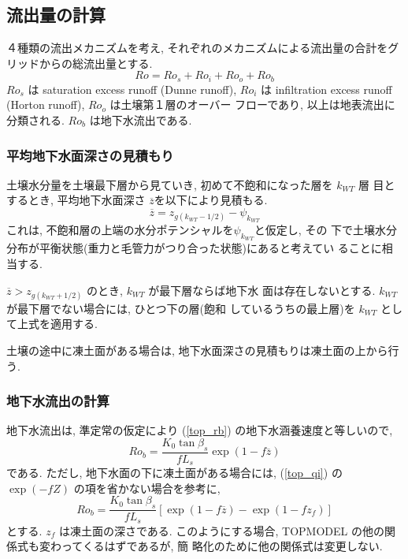 \subsection{流出量の計算}

４種類の流出メカニズムを考え, それぞれのメカニズムによる流出量の合計をグ
リッドからの総流出量とする. 
\begin{equation}
 Ro = Ro_s + Ro_i + Ro_o + Ro_b
\end{equation}
$Ro_s$ は saturation excess runoff (Dunne runoff), $Ro_i$ は
infiltration excess runoff (Horton runoff), $Ro_o$ は土壌第１層のオーバー
フローであり, 以上は地表流出に分類される. $Ro_b$ は地下水流出である. 

\subsubsection{平均地下水面深さの見積もり}

土壌水分量を土壌最下層から見ていき, 初めて不飽和になった層を $k_{WT}$ 層
目とするとき, 平均地下水面深さ $\overline{z}$を以下により見積もる. 
\begin{equation}
 \overline{z} = z_{g(k_{WT}-1/2)} - \psi_{k_{WT}}
\label{roff_table}
\end{equation}
これは, 不飽和層の上端の水分ポテンシャルを$\psi_{k_{WT}}$と仮定し, その
下で土壌水分分布が平衡状態(重力と毛管力がつり合った状態)にあると考えてい
ることに相当する. 

$\overline{z} > z_{g(k_{WT}+1/2)}$ のとき, $k_{WT}$ が最下層ならば地下水
面は存在しないとする. $k_{WT}$ が最下層でない場合には, ひとつ下の層(飽和
しているうちの最上層)を $k_{WT}$ として上式を適用する. 

土壌の途中に凍土面がある場合は, 地下水面深さの見積もりは凍土面の上から行
う. 

\subsubsection{地下水流出の計算}

地下水流出は, 準定常の仮定により (\ref{top_rb}) の地下水涵養速度と等しいので, 
\begin{equation}
 Ro_b = \frac{K_0 \tan\beta_s}{f L_s}\exp(1-f \overline{z})
\end{equation}
である. 
ただし, 地下水面の下に凍土面がある場合には, (\ref{top_qi}) の
$\exp(-fZ)$ の項を省かない場合を参考に, 
\begin{equation}
 Ro_b = \frac{K_0 \tan\beta_s}{f L_s}
  [ \exp(1-f \overline{z}) - \exp(1-f z_f) ]
\end{equation}
とする. $z_f$ は凍土面の深さである. 
このようにする場合, TOPMODEL の他の関係式も変わってくるはずであるが, 簡
略化のために他の関係式は変更しない. 

